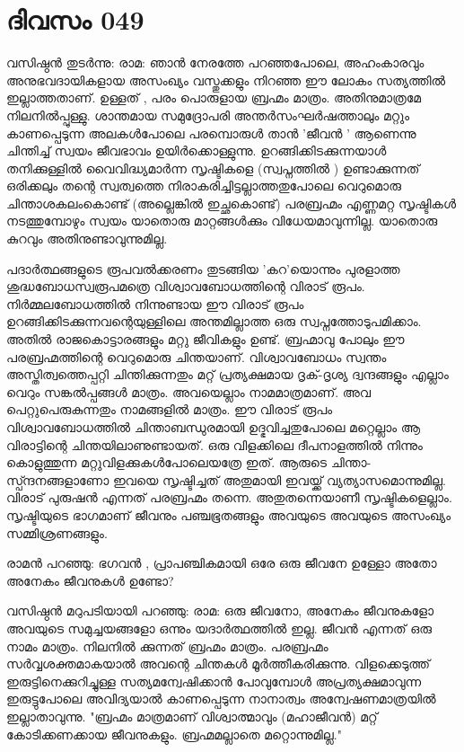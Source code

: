 \newpage
\section{ദിവസം 049}


വസിഷ്ഠന്‍ തുടര്‍ന്നു: രാമ: ഞാന്‍ നേരത്തേ പറഞ്ഞപോലെ,  അഹംകാരവും അനുഭവദായികളായ അസംഖ്യം വസ്തുക്കളും നിറഞ്ഞ ഈ ലോകം സത്യത്തിൽ ഇല്ലാത്തതാണ്‌.  ഉള്ളത്‌ , പരം പൊരുളായ ബ്രഹ്മം മാത്രം. അതിനുമാത്രമേ നിലനില്‍പ്പുള്ളു. ശാന്തമായ സമുദ്രോപരി അന്തര്‍സംഘര്‍ഷത്താലും മറ്റും കാണപ്പെടുന്ന അലകള്‍പോലെ പരമ്പൊരുള്‍ താന്‍ 'ജീവന്‍ ' ആണെന്നു ചിന്തിച്ച്‌ സ്വയം ജീവഭാവം ഉയിര്‍ക്കൊള്ളുന്നു. ഉറങ്ങിക്കിടക്കുന്നയാള്‍ തനിക്കുള്ളില്‍ വൈവിദ്ധ്യമാര്‍ന്ന സൃഷ്ടികളെ (സ്വപ്നത്തില്‍ ) ഉണ്ടാക്കുന്നത്‌ ഒരിക്കലും തന്റെ സ്വത്വത്തെ നിരാകരിച്ചിട്ടല്ലാത്തതുപോലെ വെറുമൊരു ചിന്താശകലംകൊണ്ട്‌ (അല്ലെങ്കില്‍ ഇച്ഛകൊണ്ട്‌) പരബ്രഹ്മം എണ്ണമറ്റ സൃഷ്ടികള്‍ നടത്തുമ്പോഴും സ്വയം യാതൊരു മാറ്റങ്ങള്‍ക്കും വിധേയമാവുന്നില്ല. യാതൊരു കുറവും അതിനുണ്ടാവുന്നുമില്ല.

പദാര്‍ത്ഥങ്ങളുടെ രൂപവല്‍ക്കരണം തുടങ്ങിയ 'കറ'യൊന്നും പുരളാത്ത ശുദ്ധബോധസ്വരൂപമത്രെ വിശ്വാവബോധത്തിന്റെ വിരാട്‌ രൂപം. നിര്‍മ്മലബോധത്തില്‍ നിന്നുണ്ടായ ഈ വിരാട്‌ രൂപം ഉറങ്ങിക്കിടക്കുന്നവന്റെയുള്ളിലെ അന്തമില്ലാത്ത ഒരു സ്വപ്നത്തോടുപമിക്കാം. അതില്‍ രാജകൊട്ടാരങ്ങളും മറ്റു ജീവികളും ഉണ്ട്‌. ബ്രഹ്മാവു പോലും ഈ പരബ്രഹ്മത്തിന്റെ വെറുമൊരു ചിന്തയാണ്‌. വിശ്വാവബോധം സ്വന്തം അസ്തിത്വത്തെപ്പറ്റി ചിന്തിക്കുന്നതും മറ്റ്‌ പ്രത്യക്ഷമായ ദൃക്‌-ദൃശ്യ ദ്വന്ദങ്ങളും എല്ലാം വെറും സങ്കല്‍പ്പങ്ങള്‍ മാത്രം. അവയെല്ലാം നാമമാത്രമാണ്‌. അവ പെറ്റുപെരുകുന്നതും നാമങ്ങളില്‍ മാത്രം. ഈ വിരാട്‌ രൂപം വിശ്വാവബോധത്തില്‍ ചിന്താബന്ധുരമായി ഉദ്ഭവിച്ചതുപോലെ  മറ്റെല്ലാം ആ വിരാട്ടിന്റെ ചിന്തയിലാണുണ്ടായത്‌. ഒരു വിളക്കിലെ ദീപനാളത്തില്‍ നിന്നും കൊളുത്തുന്ന മറ്റുവിളക്കുകള്‍പോലെയത്രേ ഇത്‌. ആരുടെ ചിന്താ-സ്പ്ന്ദനങ്ങളാണോ ഇവയെ സൃഷ്ടിച്ചത്‌ അതുമായി ഇവയ്ക്ക്‌ വ്യത്യാസമൊന്നുമില്ല. വിരാട്‌ പുരുഷന്‍ എന്നത്‌ പരബ്രഹ്മം തന്നെ. അതുതന്നെയാണീ സൃഷ്ടികളെല്ലാം. സൃഷ്ടിയുടെ ഭാഗമാണ്‌ ജീവനും പഞ്ചഭൂതങ്ങളും അവയുടെ അവയുടെ അസംഖ്യം സമ്മിശ്രണങ്ങളും.

രാമന്‍ പറഞ്ഞു: ഭഗവന്‍ , പ്രാപഞ്ചികമായി ഒരേ ഒരു ജീവനേ ഉള്ളോ അതോ അനേകം ജീവനുകള്‍ ഉണ്ടോ?

വസിഷ്ഠന്‍ മറുപടിയായി പറഞ്ഞു: രാമ: ഒരു ജീവനോ, അനേകം ജീവനുകളോ അവയുടെ സമുച്ചയങ്ങളോ ഒന്നും യദാര്‍ത്ഥത്തില്‍ ഇല്ല. ജീവന്‍ എന്നത്‌ ഒരു നാമം മാത്രം. നിലനില്‍ ക്കുന്നത്‌ ബ്രഹ്മം മാത്രം. പരബ്രഹ്മം സര്‍വ്വശക്തമാകയാല്‍ അവന്റെ ചിന്തകള്‍ മൂര്‍ത്തീകരിക്കുന്നു. വിളക്കെടുത്ത്‌ ഇരുട്ടിനെക്കുറിച്ചുള്ള സത്യമന്വേഷിക്കാന്‍ പോവുമ്പോള്‍ അപ്രത്യക്ഷമാവുന്ന ഇരുട്ടുപോലെ അവിദ്യയാല്‍ കാണപ്പെടുന്ന നാനാത്വം അന്വേഷണമാത്രയില്‍ ഇല്ലാതാവുന്നു. "ബ്രഹ്മം മാത്രമാണ്‌ വിശ്വാത്മാവും (മഹാജീവന്‍) മറ്റ്‌ കോടിക്കണക്കായ ജീവനുകളും. ബ്രഹ്മമല്ലാതെ മറ്റൊന്നുമില്ല."

